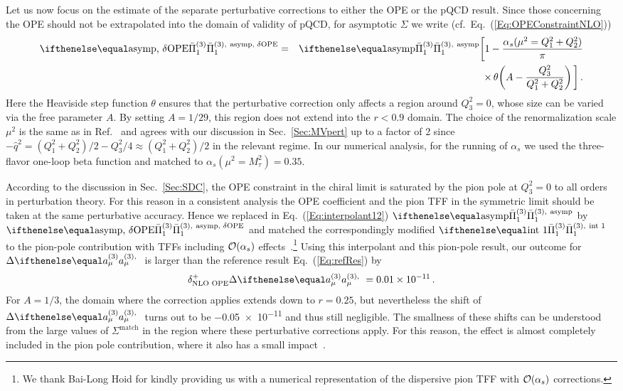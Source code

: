 Let us now focus on the estimate of the separate perturbative corrections to either the OPE or the pQCD result. Since those concerning the OPE should not be extrapolated into the domain of validity of pQCD, for asymptotic $\Sigma$ we write (cf.\ Eq.~(\ref{Eq:OPEConstraintNLO}))
\begin{eqnarray}
\Pipion[\text{asymp, $\delta$OPE}] & = & \Pipion[\text{asymp}]\bigg[1-\frac{\alpha_s(\mu^2=Q_1^2 + Q_2^2)}{\pi} \nonumber \\
&&\qquad\times \operatorname{\theta}\!\left(A-\frac{Q_3^2}{Q_1^2 + Q_2^2}\right)\bigg]\,.
\label{Eq:Pi1NLOMVOPE}
\end{eqnarray}
Here the Heaviside step function $\theta$ ensures that the perturbative correction only affects a region around $Q_3^2 = 0$, whose size can be varied via the free parameter $A$. By setting $A=1/29$, this region does not extend into the $r<0.9$ domain. The choice of the renormalization scale $\mu^2$ is the same as in Ref.~\cite{PionTFF} and agrees with our discussion in Sec.~\ref{Sec:MVpert} up to a factor of 2 since $-\hat{q}^2 = (Q_1^2 + Q_2^2)/2 - Q_3^2/4 \approx (Q_1^2 + Q_2^2)/2$ in the relevant regime. In our numerical analysis, for the running of $\alpha_s$ we used the three-flavor one-loop beta function and matched to $\alpha_s(\mu^2 = M_\tau^2) = 0.35$.

According to the discussion in Sec.~\ref{Sec:SDC}, the OPE constraint in the chiral limit is saturated by the pion pole at $Q_3^2 = 0$ to all orders in perturbation theory. For this reason in a consistent analysis the OPE coefficient and the pion TFF in the symmetric limit should be taken at the same perturbative accuracy. Hence we replaced in Eq.~(\ref{Eq:interpolant12}) $\Pipion[\text{asymp}]$ by $\Pipion[\text{asymp, $\delta$OPE}]$ and matched the correspondingly modified $\Pipion[\text{int 1}]$ to the pion-pole contribution with TFFs including $\mathcal{O}(\alpha_s)$ effects~\cite{Braaten, PionTFF}.\footnote{We thank Bai-Long Hoid for kindly providing us with a numerical representation of the dispersive pion TFF with $\mathcal{O}(\alpha_s)$ corrections.} Using this interpolant and this pion-pole result, our outcome for $\Delta \aPion$ is larger than the reference result Eq.~(\ref{Eq:refRes}) by
\begin{equation}
\delta_\text{NLO OPE}^+ \Delta \aPion = \num{0.01e-11}\,.
\label{Eq:uncNLOMV}
\end{equation}
For $A=1/3$, the domain where the correction applies extends down to $r=0.25$, but nevertheless the shift of $\Delta \aPion$ turns out to be \num{-0.05e-11} and thus still negligible. The smallness of these shifts can be understood from the large values of $\Sigma^\text{match}$ in the region where these perturbative corrections apply. For this reason, the effect is almost completely included in the pion pole contribution, where it also has a small impact~\cite{PionTFF}.

